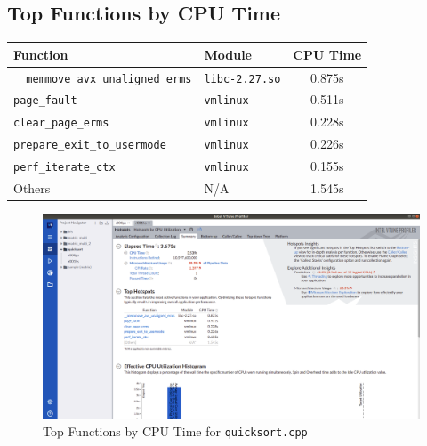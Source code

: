 \documentclass[11pt, swedish, openany]{book}
\begin{document}
\subsection*{Top Functions by CPU Time}
\begin{table}[H]
    \begin{tabular}{||l|l||c||}
        \hline
        Function                                   & Module                & CPU Time \\
        \hline
        \texttt{\_\_memmove\_avx\_unaligned\_erms} & \texttt{libc-2.27.so} & 0.875s   \\
        \texttt{page\_fault}                       & \texttt{vmlinux}      & 0.511s   \\
        \texttt{clear\_page\_erms}                 & \texttt{vmlinux}      & 0.228s   \\
        \texttt{prepare\_exit\_to\_usermode}       & \texttt{vmlinux}      & 0.226s   \\
        \texttt{perf\_iterate\_ctx}                & \texttt{vmlinux}      & 0.155s   \\
        Others                                     & N/A                   & 1.545s   \\
        \hline
    \end{tabular}
\end{table}

\begin{figure}[H]
    \centering
    \includegraphics[scale=0.25]{vtune/quicksort/hs.png}
    \caption{Top Functions by CPU Time for \texttt{quicksort.cpp}}
\end{figure}

\newpage
\end{document}
